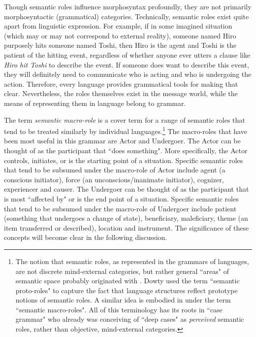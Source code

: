 Though semantic roles influence morphosyntax profoundly, they are not primarily morphosyntactic (grammatical) categories. Technically, semantic roles exist quite apart from linguistic expression. For example, if in some imagined situation (which may or may not correspond to external reality), someone named Hiro purposely hits someone named Toshi, then Hiro is the agent and Toshi is the patient of the hitting event, regardless of whether anyone ever utters a clause like \textit{Hiro hit Toshi} to describe the event. If someone does want to describe this event, they will definitely need to communicate who is acting and who is undergoing the action. Therefore, every language provides grammatical tools for making that clear. Nevertheless, the roles themselves exist in the message world, while the means of representing them in language belong to grammar.

The term \textit{semantic macro-role} \citep{vanvalin1997} is a cover term for a range of semantic roles that tend to be treated similarly by individual languages.\footnote{The notion that semantic roles, as represented in the grammars of languages, are not discrete mind-external categories, but rather general “areas" of semantic space probably originated with \citet{dowty1991}. Dowty used the term “semantic proto-roles" to capture the fact that language structures reflect prototype notions of semantic roles. A similar idea is embodied in \citet{vanvalin1997} under the term “semantic macro-roles". All of this terminology has its roots in “case grammar" \citep{fillmore1977} who already was conceiving of “deep cases" as \textit{perceived} semantic roles, rather than objective, mind-external categories.} The macro-roles that have been most useful in this grammar are Actor and Undergoer. The Actor can be thought of as the participant that “does something". More specifically, the Actor controls, initiates, or is the starting point of a situation. Specific semantic roles that tend to be subsumed under the macro-role of Actor include agent (a conscious initiator), force (an unconscious/inanimate initiator), cognizer, experiencer and causer. The Undergoer can be thought of as the participant that is most “affected by" or is the end point of a situation. Specific semantic roles that tend to be subsumed under the macro-role of Undergoer include patient (something that undergoes a change of state), beneficiary, maleficiary, theme (an item transferred or described), location and instrument. The significance of these concepts will become clear in the following discussion.

